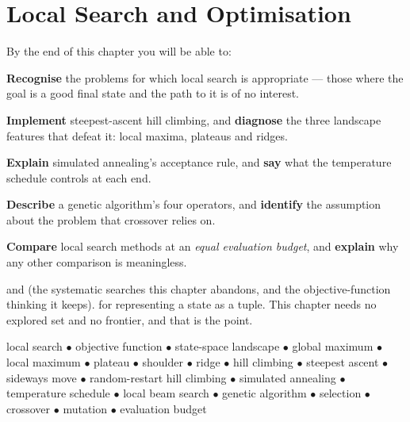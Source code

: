 \chapter{Local Search and Optimisation}\label{ch:local}

\begin{outcomes}
By the end of this chapter you will be able to:
\begin{tight}
  \item \textbf{Recognise} the problems for which local search is appropriate ---
        those where the goal is a good final state and the path to it is of no
        interest.
  \item \textbf{Implement} steepest-ascent hill climbing, and \textbf{diagnose}
        the three landscape features that defeat it: local maxima, plateaus and
        ridges.
  \item \textbf{Explain} simulated annealing's acceptance rule, and \textbf{say}
        what the temperature schedule controls at each end.
  \item \textbf{Describe} a genetic algorithm's four operators, and
        \textbf{identify} the assumption about the problem that crossover relies
        on.
  \item \textbf{Compare} local search methods at an \emph{equal evaluation budget},
        and \textbf{explain} why any other comparison is meaningless.
\end{tight}
\end{outcomes}

\begin{prereq}
 and  (the systematic searches this chapter
abandons, and the objective-function thinking it keeps).  for
representing a state as a tuple. This chapter needs no explored set and no
frontier, and that is the point.
\end{prereq}

\begin{keyterms}
local search $\bullet$ objective function $\bullet$ state-space landscape $\bullet$
global maximum $\bullet$ local maximum $\bullet$ plateau $\bullet$ shoulder
$\bullet$ ridge $\bullet$ hill climbing $\bullet$ steepest ascent $\bullet$
sideways move $\bullet$ random-restart hill climbing $\bullet$ simulated annealing
$\bullet$ temperature schedule $\bullet$ local beam search $\bullet$ genetic
algorithm $\bullet$ selection $\bullet$ crossover $\bullet$ mutation $\bullet$
evaluation budget
\end{keyterms}

